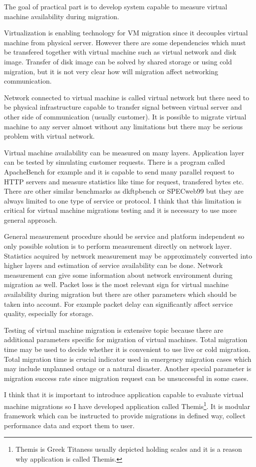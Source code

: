 
The goal of practical part is to develop system capable to measure virtual machine availability during migration. 

Virtualization is enabling technology for \Ac{VM} migration since it decouples virtual machine from physical server. However there are some dependencies which must be transfered together with virtual machine such as virtual network and disk image. Transfer of disk image can be solved by shared storage or using cold migration, but it is not very clear how will migration affect networking communication.

Network connected to virtual machine is called virtual network but there need to be physical infrastructure capable to transfer signal between virtual server and other side of communication (usually customer). It is possible to migrate virtual machine to any server almost without any limitations but there may be serious problem with virtual network. 

Virtual machine availability can be measured on many layers. Application layer can be tested by simulating customer requests. There is a program called ApacheBench for example and it is capable to send many parallel request to \Ac{HTTP} servers and measure statistics like time for request, transfered bytes etc. There are other similar benchmarks as dkftpbench or SPECweb99 but they are always limited to one type of service or protocol. I think that this limitation is critical for virtual machine migrations testing and it is necessary to use more general approach.

General measurement procedure should be service and platform independent so only possible solution is to perform measurement directly on network layer. Statistics acquired by network measurement may be approximately converted into higher layers and estimation of service availability can be done. Network measurement can give some information about network environment during migration as well. Packet loss is the most relevant sign for virtual machine availability during migration but there are other parameters which should be taken into account. For example packet delay can significantly affect service quality, especially for storage.

Testing of virtual machine migration is extensive topic because there are additional parameters specific for migration of virtual machines. Total migration time may be used to decide whether it is convenient to use live or cold migration. Total migration time is crucial indicator used in emergency migration cases which may include unplanned outage or a natural disaster. Another special parameter is migration success rate since migration request can be unsuccessful in some cases.

I think that it is important to introduce application capable to evaluate virtual machine migrations so I have developed application called Themis\footnote{Themis is Greek Titaness usually depicted holding scales and it is a reason why application is called Themis.}. It is modular framework which can be instructed to provide migrations in defined way, collect performance data and export them to user.

